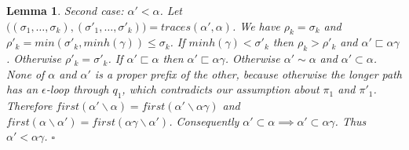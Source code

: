 \documentclass[AMA,STIX1COL]{WileyNJD-v2}
\newtheorem{XLem}{Lemma}
\begin{document}
\begin{XLem}
    Second case: $\alpha' < \alpha$.
    Let $\big( (\sigma_1, \hdots, \sigma_k), (\sigma'_1, \hdots, \sigma'_k) \big) = traces (\alpha', \alpha)$.
    We have $\rho_k = \sigma_k$ and $\rho'_k = min (\sigma'_k, minh(\gamma)) \leq \sigma_k$.
    If $minh(\gamma) < \sigma'_k$ then $\rho_k > \rho'_k$ and $\alpha' \sqsubset \alpha \gamma$.
    Otherwise $\rho'_k = \sigma'_k$.
    If $\alpha' \sqsubset \alpha$ then $\alpha' \sqsubset \alpha \gamma$.
    Otherwise $\alpha' \sim \alpha$ and $\alpha' \subset \alpha$.
    None of $\alpha$ and $\alpha'$ is a proper prefix of the other,
    because otherwise the longer path has an $\epsilon$-loop through $q_1$, which contradicts our assumption about $\pi_1$ and $\pi'_1$.
    Therefore $first (\alpha' \backslash \alpha) = first (\alpha' \backslash \alpha \gamma)$
    and $first (\alpha \backslash \alpha') = first (\alpha \gamma \backslash \alpha')$.
    Consequently $\alpha' \subset \alpha \implies \alpha' \subset \alpha \gamma$.
    Thus $\alpha' < \alpha \gamma$.
    $\square$
    \end{XLem}
\fi
\end{document}
